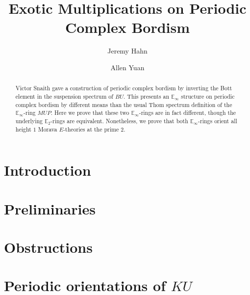 \documentclass[reqno, oneside]{amsart}
\theoremstyle{definition}
\theoremstyle{plain}
\begin{document}
\title{Exotic Multiplications on Periodic Complex Bordism}
\author{Jeremy Hahn}
\address{Department of Mathematics, Massachusetts Institute of Technology, Cambridge, MA 02139}

\author{Allen Yuan}
\address{Department of Mathematics, Massachusetts Institute of Technology, Cambridge, MA 02139}

\begin{abstract}
Victor Snaith gave a construction of periodic complex bordism by inverting the Bott element in the suspension spectrum of $BU$.  This presents an $\mathbb{E}_\infty$ structure on periodic complex bordism by different means than the usual Thom spectrum definition of the $\mathbb{E}_\infty$-ring $MUP$.  Here we prove that these two $\mathbb{E}_\infty$-rings are in fact different, though the underlying $\mathbb{E}_2$-rings are equivalent.  Nonetheless, we prove that both $\mathbb{E}_\infty$-rings orient all height $1$ Morava $E$-theories at the prime $2$.
\end{abstract}





\setcounter{tocdepth}{1}
\maketitle

\tableofcontents



\section{Introduction}



\section{Preliminaries}



\section{Obstructions} \label{sec:PowOp}



\section{Periodic orientations of $KU$}\label{sec:MUPKU}





\end{document}
